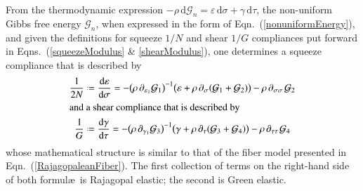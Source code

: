 From the thermo\-dynamic expression $-\rho \, \mathrm{d} \mathcal{G}_n = \varepsilon \, \mathrm{d} \sigma + \gamma \, \mathrm{d} \tau$, the non-uniform Gibbs free energy $\mathcal{G}_n$, when expressed in the form of Eqn.~(\ref{nonuniformEnergy}), and given the definitions for squeeze $1/N$ and shear $1/G$ compliances put forward in Eqns.~(\ref{squeezeModulus} \& \ref{shearModulus}), one determines a squeeze compliance that is described by
\begin{subequations}
    \label{nonuniformCompliances}
    \begin{align}
    \frac{1}{2N} & \defeq \frac{\mathrm{d} \varepsilon}{\mathrm{d} \sigma} = - \bigl( \rho \, \partial_{\varepsilon_1} \mathcal{G}_1 \bigr)^{-1} \bigl( \varepsilon + \rho \, \partial_{\sigma} ( \mathcal{G}_1 + \mathcal{G}_2 ) \bigr) - \rho \, \partial_{\sigma\sigma\,} \mathcal{G}_2
    \label{squeezeCompliance} \\
    \intertext{and a shear compliance that is described by}
    \frac{1}{G} & \defeq \frac{\mathrm{d} \gamma}{\mathrm{d} \tau} = - \bigl( \rho \, \partial_{\gamma_1} \mathcal{G}_3 \bigr)^{-1} \bigl( \gamma + \rho \, \partial_{\tau} ( \mathcal{G}_3 + \mathcal{G}_4 ) \bigr) - \rho \, \partial_{\tau\tau\,} \mathcal{G}_4
    \label{shearCompliance}
    \end{align}
\end{subequations}
whose mathematical structure is similar to that of the fiber model presented in Eqn.~(\ref{RajagopaleanFiber}).  The first collection of terms on the right-hand side of both formul\ae\ is Rajagopal elastic; the second is Green elastic.  

